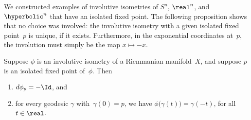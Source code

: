 We constructed examples of involutive isometries of $S^n$, $\real^n$,
and~$\hyperbolic^n$ that have an isolated fixed point. The following
proposition shows that no choice was involved: the involutive
isometry with a given isolated fixed point~$p$ is unique, if it
exists. Furthermore, in the exponential coordinates at~$p$, the
involution must simply be the map $x \mapsto -x$.

\begin{prop} \label{phiunique}
 Suppose $\phi$ is an involutive isometry of a Riemmanian
manifold~$X$, and suppose $p$ is an isolated fixed point of~$\phi$.
Then
 \begin{enumerate}
 \item \label{phiunique-dphi}
 $d\phi_p = - \Id$, and
 \item \label{phiunique-phi}
 for every geodesic $\gamma$ with~$\gamma(0) = p$, we have $\phi
\bigl( \gamma(t) \bigr) = \gamma(-t)$, for all $t \in \real$.
 \end{enumerate}
 \end{prop}

